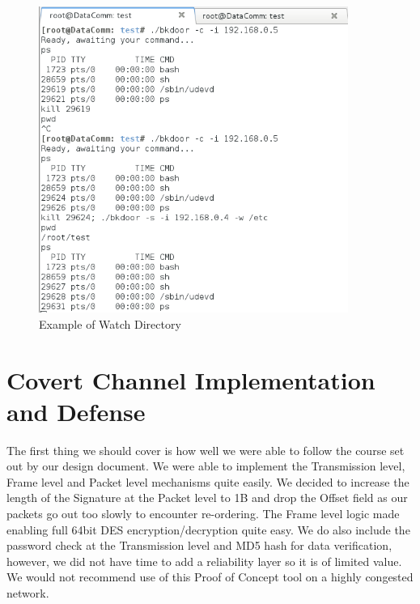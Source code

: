 \documentclass[titlepage]{article}
\begin{document}
\begin{figure}[htb]                                                                       
  \begin{center}
    \includegraphics[width=0.9\textwidth]{Pictures/Watch.png}
  \end{center}
  \caption{Example of Watch Directory}
  \label{fig:watch}
\end{figure}

\clearpage

\section{Covert Channel Implementation and Defense}

The first thing we should cover is how well we were able to follow the course set out by our design document.  We were able to implement the Transmission level, Frame level and Packet level mechanisms quite easily.  We decided to increase the length of the Signature at the Packet level to 1B and drop the Offset field as our packets go out too slowly to encounter re-ordering.  The Frame level logic made enabling full 64bit DES encryption/decryption quite easy.  We do also include the password check at the Transmission level and MD5 hash for data verification, however, we did not have time to add a reliability layer so it is of limited value. We would not recommend use of this Proof of Concept tool on a highly congested network.
\end{document}

